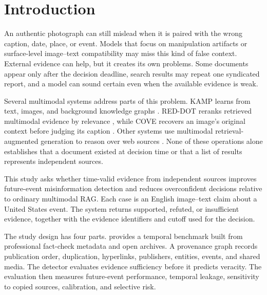 \section{Introduction}

An authentic photograph can still mislead when it is paired with the wrong caption, date, place, or event. Models that focus on manipulation artifacts or surface-level image--text compatibility may miss this kind of false context. External evidence can help, but it creates its own problems. Some documents appear only after the decision deadline, search results may repeat one syndicated report, and a model can sound certain even when the available evidence is weak.

Several multimodal systems address parts of this problem. KAMP learns from text, images, and background knowledge graphs \cite{zhang2025kamp}. RED-DOT reranks retrieved multimodal evidence by relevance \cite{papadopoulos2025reddot}, while COVE recovers an image's original context before judging its caption \cite{tonglet2025cove}. Other systems use multimodal retrieval-augmented generation to reason over web sources \cite{khaliq2024ragar,kangur2025multireflect}. None of these operations alone establishes that a document existed at decision time or that a list of results represents independent sources.

This study asks whether time-valid evidence from independent sources improves future-event misinformation detection and reduces overconfident decisions relative to ordinary multimodal RAG. Each case is an English image--text claim about a United States event. The system returns supported, refuted, or insufficient evidence, together with the evidence identifiers and cutoff used for the decision.

The study design has four parts. \datasetname{} provides a temporal benchmark built from professional fact-check metadata and open archives. A provenance graph records publication order, duplication, hyperlinks, publishers, entities, events, and shared media. The detector evaluates evidence sufficiency before it predicts veracity. The evaluation then measures future-event performance, temporal leakage, sensitivity to copied sources, calibration, and selective risk.

